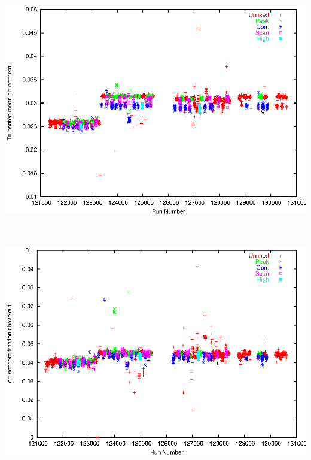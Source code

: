 \documentclass[12pt]{article}
\begin{document}
\mbox{ }

\vfill
\includegraphics[height=0.9\linewidth, angle=90]{meancuterrcotth.eps}

\vfill
\pagebreak

\mbox{ }

\vfill
\includegraphics[height=0.9\linewidth, angle=90]{fracerrcotth.eps}

\vfill
\pagebreak
\end{document}

